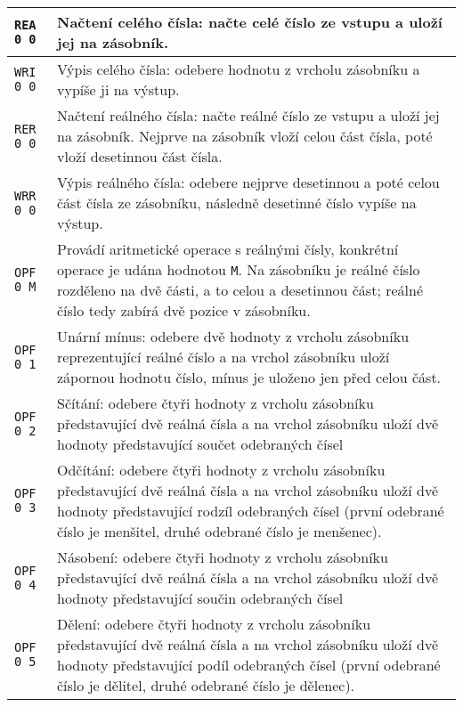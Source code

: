 \documentclass{article}
\begin{document}
\begin{longtable}{|l| p{10cm}|}
		\rule{0pt}{3ex} \texttt{REA 0 0} & Načtení celého čísla: načte celé číslo ze vstupu a uloží jej na zásobník. \\ \hline
		
		\rule{0pt}{3ex} \texttt{WRI 0 0} & Výpis celého čísla: odebere hodnotu z vrcholu zásobníku a vypíše ji na výstup. \\ \hline
		
		\rule{0pt}{3ex} \texttt{RER 0 0} & Načtení reálného čísla: načte reálné číslo ze vstupu a uloží jej na zásobník. Nejprve na zásobník vloží celou část čísla, poté vloží desetinnou část čísla. \\ \hline
		
		\rule{0pt}{3ex} \texttt{WRR 0 0} & Výpis reálného čísla: odebere nejprve desetinnou a poté celou část čísla ze zásobníku, následně desetinné číslo vypíše na výstup.\\ \hline
		
		\rule{0pt}{3ex} \texttt{OPF 0 M} & Provádí aritmetické operace s reálnými čísly, konkrétní operace je udána hodnotou \texttt{M}. Na zásobníku je reálné číslo rozděleno na dvě části, a to celou a desetinnou část; reálné číslo tedy zabírá dvě pozice v zásobníku.\\
		
		\rule{0pt}{4ex} \texttt{OPF 0 1} & Unární mínus: odebere dvě hodnoty z vrcholu zásobníku reprezentující reálné číslo a na vrchol zásobníku uloží zápornou hodnotu číslo, mínus je uloženo jen před celou část. \\
		
		\rule{0pt}{4ex} \texttt{OPF 0 2} & Sčítání: odebere čtyři hodnoty z vrcholu zásobníku představující dvě reálná čísla a na vrchol zásobníku uloží dvě hodnoty představující součet odebraných čísel \\
		
		\rule{0pt}{4ex} \texttt{OPF 0 3} & Odčítání: odebere čtyři hodnoty z vrcholu zásobníku představující dvě reálná čísla a na vrchol zásobníku uloží dvě hodnoty představující rodzíl odebraných čísel (první odebrané číslo je menšitel, druhé odebrané číslo je menšenec). \\
		
		\rule{0pt}{4ex} \texttt{OPF 0 4} & Násobení: odebere čtyři hodnoty z vrcholu zásobníku představující dvě reálná čísla a na vrchol zásobníku uloží dvě hodnoty představující součin odebraných čísel \\
		
		\rule{0pt}{4ex} \texttt{OPF 0 5} & Dělení: odebere čtyři hodnoty z vrcholu zásobníku představující dvě reálná čísla a na vrchol zásobníku uloží dvě hodnoty představující podíl odebraných čísel (první odebrané číslo je dělitel, druhé odebrané číslo je dělenec). \\		
		

\end{longtable}
\end{document}
